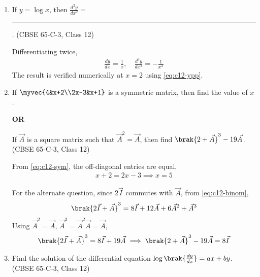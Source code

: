 \begin{enumerate}[label=\thesubsection.\arabic*., ref=\thesubsection.\theenumi]
\begin{center}
\end{center}
 
\item If $y=\log x$, then $\frac{d^2y}{dx^2}=$ \rule{1cm}{0.2pt}.
\hfill (CBSE 65-C-3, Class 12)
 
\solution Differentiating twice,
\begin{align}
\frac{dy}{dx} = \frac{1}{x},\quad
\frac{d^2y}{dx^2} = -\frac{1}{x^2}
\end{align}
The result is verified numerically at $x=2$ using \eqref{eq:c12-ypp}.
 
\begin{center}
\end{center}
 
\item If $\myvec{4&x+2\\2x-3&x+1}$ is a symmetric matrix, then find the value of $x$.
\begin{center}\textbf{OR}\end{center}
If $\vec{A}$ is a square matrix such that $\vec{A}^2=\vec{A}$, then find $\brak{2+\vec{A}}^3-19\vec{A}$.
\hfill (CBSE 65-C-3, Class 12)
 
\solution From \eqref{eq:c12-sym}, the off-diagonal entries are equal,
\begin{align}
x+2 = 2x-3 \implies x = 5
\end{align}
 
For the alternate question, since $2\vec{I}$ commutes with $\vec{A}$, from \eqref{eq:c12-binom},
\begin{align}
\brak{2\vec{I}+\vec{A}}^3 = 8\vec{I}+12\vec{A}+6\vec{A}^2+\vec{A}^3
\end{align}
Using $\vec{A}^2=\vec{A}$, $\vec{A}^3=\vec{A}^2\vec{A}=\vec{A}$,
\begin{align}
\brak{2\vec{I}+\vec{A}}^3 = 8\vec{I}+19\vec{A}
\implies \brak{2+\vec{A}}^3-19\vec{A} = 8\vec{I}
\end{align}
 
\begin{center}
\end{center}
 
\item Find the solution of the differential equation $\log\brak{\frac{dy}{dx}}=ax+by$.
\hfill (CBSE 65-C-3, Class 12)
 

\end{enumerate}
